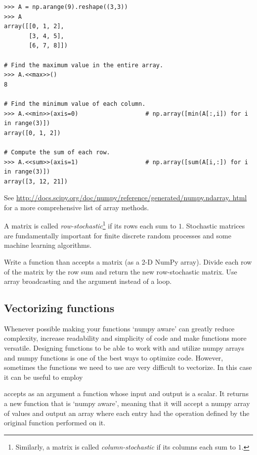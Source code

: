 \begin{lstlisting}
>>> A = np.arange(9).reshape((3,3))
>>> A
array([[0, 1, 2],
       [3, 4, 5],
       [6, 7, 8]])

# Find the maximum value in the entire array.
>>> A.<<max>>()
8

# Find the minimum value of each column.
>>> A.<<min>>(axis=0)                   # np.array([min(A[:,i]) for i in range(3)])
array([0, 1, 2])

# Compute the sum of each row.
>>> A.<<sum>>(axis=1)                   # np.array([sum(A[i,:]) for i in range(3)])
array([3, 12, 21])
\end{lstlisting}

See \url{http://docs.scipy.org/doc/numpy/reference/generated/numpy.ndarray.
html} for a more comprehensive list of array methods.

\begin{problem} %
A matrix is called \emph{row-stochastic}\footnote{Similarly, a matrix is called \emph{column-stochastic} if its columns each sum to $1$.} if its rows each sum to $1$.
Stochastic matrices are fundamentally important for finite discrete random processes and some machine learning algorithms.

Write a function than accepts a matrix (as a 2-D NumPy array).
Divide each row of the matrix by the row sum and return the new row-stochastic matrix.
Use array broadcasting and the  argument instead of a loop.
\end{problem}

\subsection*{Vectorizing functions}

Whenever possible making your functions `numpy aware' can greatly reduce complexity, increase readability and simplicity of code and make functions more versatile. Designing functions to be able to work with and utilize numpy arrays and numpy functions is one of the best ways to optimize code. However, sometimes the functions we need to use are very difficult to vectorize. In this case it can be useful to employ 

 accepts as an argument a function whose input and output is a scalar. It returns a new function that is `numpy aware', meaning that it will accept a numpy array of values and output an array where each entry had the operation defined by the original function performed on it.

